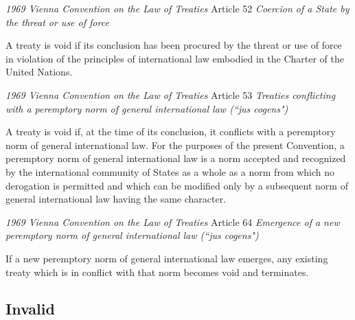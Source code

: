 \begin{conventiondetails}{\textit{1969 Vienna Convention on the Law of Treaties} Article 52}\label{VCLT Art 52}
    \flushleft
    \textit{Coercion of a State by the threat or use of force}

    \vspace{\baselineskip}

    A treaty is void if its conclusion has been procured by the threat or use of force in violation of the  principles of international law embodied in the Charter of the United Nations.
\end{conventiondetails}

\begin{conventiondetails}{\textit{1969 Vienna Convention on the Law of Treaties} Article 53}\label{VCLT Art 53}
    \flushleft
    \textit{Treaties conflicting with a peremptory norm of general international law (``jus cogens")}

    \vspace{\baselineskip}

    A treaty is void if, at the time of its conclusion, it conflicts with a peremptory norm of general international law. For the purposes of the present Convention, a peremptory norm of general international law is a norm accepted and recognized by the international community of States as a whole as a norm from which no derogation is permitted and which can be modified only by a subsequent norm of general international law having the same character.
\end{conventiondetails}

\begin{conventiondetails}{\textit{1969 Vienna Convention on the Law of Treaties} Article 64}\label{VCLT Art 64}
    \flushleft
    \textit{Emergence of a new peremptory norm of general international law (``jus cogens")}

    \vspace{\baselineskip}

    If a new peremptory norm of general international law emerges, any existing treaty which is in  conflict with that norm becomes void and terminates.
\end{conventiondetails}

\subsection{Invalid}


